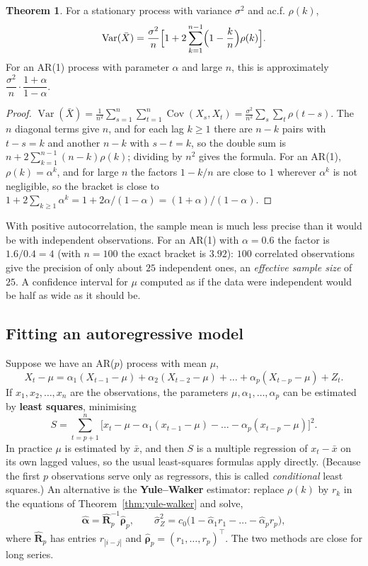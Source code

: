 \documentclass[11pt,a4paper]{article}
\theoremstyle{definition}
\newtheorem{thm}{Theorem}[subsection]
\DeclareMathOperator{\Var}{Var}
\DeclareMathOperator{\Cov}{Cov}
\begin{document}
\begin{thm}\label{thm:var-mean}
For a stationary process with variance $\sigma^2$ and ac.f. $\rho(k)$,
\[
\Var(\bar X) = \frac{\sigma^2}{n}\Bigl[1 + 2\sum_{k=1}^{n-1}\Bigl(1 - \frac kn\Bigr)\rho(k)\Bigr] .
\]
For an AR(1) process with parameter $\alpha$ and large $n$, this is approximately $\dfrac{\sigma^2}{n}\cdot\dfrac{1 + \alpha}{1 - \alpha}$.
\end{thm}

\begin{proof}
$\Var(\bar X) = \frac1{n^2}\sum_{s=1}^n\sum_{t=1}^n\Cov(X_s, X_t) = \frac{\sigma^2}{n^2}\sum_s\sum_t\rho(t - s)$. The $n$ diagonal terms give $n$, and for each lag $k \ge 1$ there are
$n - k$ pairs with $t - s = k$ and another $n - k$ with $s - t = k$, so the double sum is $n + 2\sum_{k=1}^{n-1}(n - k)\rho(k)$; dividing by $n^2$ gives the
formula. For an AR(1), $\rho(k) = \alpha^k$, and for large $n$ the factors $1 - k/n$ are close to $1$ wherever $\alpha^k$ is not negligible, so the bracket
is close to $1 + 2\sum_{k\ge1}\alpha^k = 1 + 2\alpha/(1 - \alpha) = (1 + \alpha)/(1 - \alpha)$.
\end{proof}

With positive autocorrelation, the sample mean is much less precise than it would be with
independent observations. For an AR(1) with $\alpha = 0.6$ the factor is $1.6/0.4 = 4$ (with $n = 100$ the exact bracket is $3.92$): $100$ correlated
observations give the precision of only about $25$ independent ones, an \emph{effective sample size} of $25$. A confidence
interval for $\mu$ computed as if the data were independent would be half as wide as it should be.

\subsection{Fitting an autoregressive model}
Suppose we have an AR($p$) process with mean $\mu$,
\[
X_t - \mu = \alpha_1(X_{t-1} - \mu) + \alpha_2(X_{t-2} - \mu) + \dots + \alpha_p(X_{t-p} - \mu) + Z_t .
\]
If $x_1, x_2, \dots, x_n$ are the observations, the parameters $\mu, \alpha_1, \dots, \alpha_p$ can be estimated by \textbf{least squares}, minimising
\[
S = \sum_{t=p+1}^n\bigl[x_t - \mu - \alpha_1(x_{t-1} - \mu) - \dots - \alpha_p(x_{t-p} - \mu)\bigr]^2 .
\]
In practice $\mu$ is estimated by $\bar x$, and then $S$ is a multiple regression of $x_t - \bar x$ on its own lagged values, so the usual
least-squares formulas apply directly. (Because the first $p$ observations serve only as regressors, this is
called \emph{conditional} least squares.) An alternative is the \textbf{Yule--Walker} estimator: replace $\rho(k)$ by $r_k$ in the
equations of Theorem~\ref{thm:yule-walker} and solve,
\[
\hat{\boldsymbol\alpha} = \hat{\mathbf{R}}_p^{-1}\hat{\boldsymbol\rho}_p , \qquad \hat\sigma_Z^2 = c_0\bigl(1 - \hat\alpha_1r_1 - \dots - \hat\alpha_pr_p\bigr) ,
\]
where $\hat{\mathbf{R}}_p$ has entries $r_{|i-j|}$ and $\hat{\boldsymbol\rho}_p = (r_1, \dots, r_p)^\top$. The two methods are close for long series.
\end{document}
